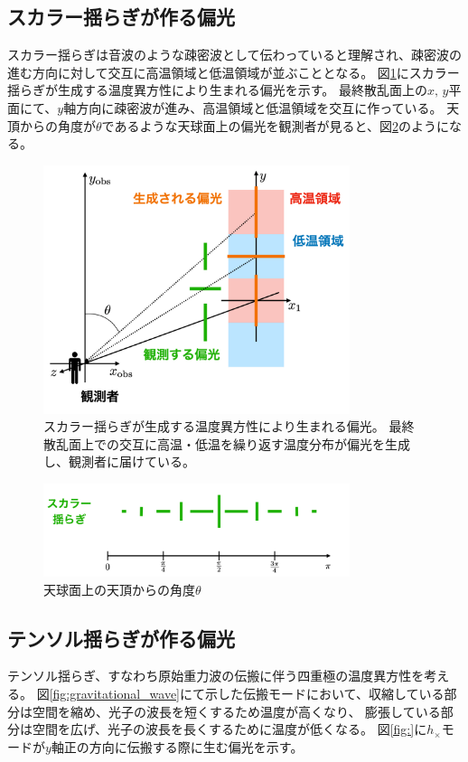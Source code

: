 \documentclass[../../main.tex]{subfiles}
\begin{document}
\subsection{スカラー揺らぎが作る偏光}
スカラー揺らぎは音波のような疎密波として伝わっていると理解され、疎密波の進む方向に対して交互に高温領域と低温領域が並ぶこととなる。
図\ref{fig:scalar_polarization}にスカラー揺らぎが生成する温度異方性により生まれる偏光を示す。
最終散乱面上の$x,\,y$平面にて、$y$軸方向に疎密波が進み、高温領域と低温領域を交互に作っている。
天頂からの角度が$\theta$であるような天球面上の偏光を観測者が見ると、図\ref{fig:scalar_pol_theta}のようになる。
\begin{figure}
    \centering
    \includegraphics[width=0.8\textwidth]{intro/scalar_polarization.pdf}
    \caption{スカラー揺らぎが生成する温度異方性により生まれる偏光。
    最終散乱面上での交互に高温・低温を繰り返す温度分布が偏光を生成し、観測者に届けている。}
    \label{fig:scalar_polarization}
\end{figure}
\begin{figure}
    \centering
    \includegraphics[width=0.8\textwidth]{intro/scalar_pol_theta.pdf}
    \caption{天球面上の天頂からの角度$\theta$}
    \label{fig:scalar_pol_theta}
\end{figure}
\subsection{テンソル揺らぎが作る偏光}
テンソル揺らぎ、すなわち原始重力波の伝搬に伴う四重極の温度異方性を考える。
図\ref{fig:gravitational_wave}にて示した伝搬モードにおいて、収縮している部分は空間を縮め、光子の波長を短くするため温度が高くなり、
膨張している部分は空間を広げ、光子の波長を長くするために温度が低くなる。
図\ref{fig:}に$h_{\times}$モードが$y$軸正の方向に伝搬する際に生む偏光を示す。
\end{document}

